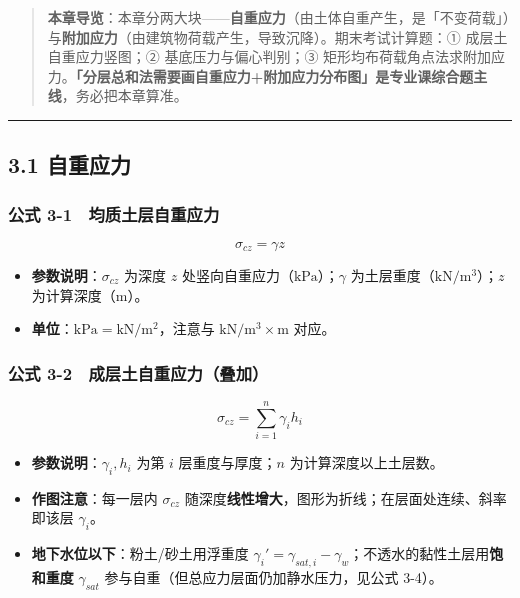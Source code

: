 \documentclass[
]{article}
\providecommand{\tightlist}{%
  \setlength{\itemsep}{0pt}\setlength{\parskip}{0pt}}
\begin{document}
\begin{quote}
\textbf{本章导览}：本章分两大块------\textbf{自重应力}（由土体自重产生，是「不变荷载」）与\textbf{附加应力}（由建筑物荷载产生，导致沉降）。期末考试计算题：①
成层土自重应力竖图；② 基底压力与偏心判别；③
矩形均布荷载角点法求附加应力。\textbf{「分层总和法需要画自重应力+附加应力分布图」是专业课综合题主线}，务必把本章算准。
\end{quote}

\begin{center}\rule{0.5\linewidth}{0.5pt}\end{center}

\subsection{3.1 自重应力}\label{ux81eaux91cdux5e94ux529b}

\subsubsection{公式
3-1　均质土层自重应力}\label{ux516cux5f0f-3-1-ux5747ux8d28ux571fux5c42ux81eaux91cdux5e94ux529b}

\[\sigma_{cz}=\gamma z\]

\begin{itemize}
\tightlist
\item
  \textbf{参数说明}：\(\sigma_{cz}\) 为深度 \(z\)
  处竖向自重应力（\(\mathrm{kPa}\)）；\(\gamma\)
  为土层重度（\(\mathrm{kN/m^3}\)）；\(z\) 为计算深度（m）。
\item
  \textbf{单位}：\(\mathrm{kPa}=\mathrm{kN/m^2}\)，注意与
  \(\mathrm{kN/m^3}\times\mathrm{m}\) 对应。
\end{itemize}

\subsubsection{公式
3-2　成层土自重应力（叠加）}\label{ux516cux5f0f-3-2-ux6210ux5c42ux571fux81eaux91cdux5e94ux529bux53e0ux52a0}

\[\sigma_{cz}=\sum_{i=1}^{n}\gamma_i h_i\]

\begin{itemize}
\tightlist
\item
  \textbf{参数说明}：\(\gamma_i,h_i\) 为第 \(i\) 层重度与厚度；\(n\)
  为计算深度以上土层数。
\item
  \textbf{作图注意}：每一层内 \(\sigma_{cz}\)
  随深度\textbf{线性增大}，图形为折线；在层面处连续、斜率即该层
  \(\gamma_i\)。
\item
  \textbf{地下水位以下}：粉土/砂土用浮重度
  \(\gamma_i'=\gamma_{sat,i}-\gamma_w\)；不透水的黏性土层用\textbf{饱和重度}
  \(\gamma_{sat}\) 参与自重（但总应力层面仍加静水压力，见公式 3-4）。
\end{itemize}
\end{document}

